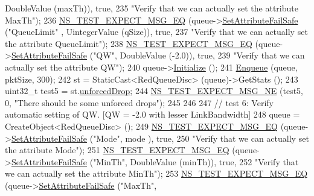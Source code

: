 \begin{DoxyCode}
      DoubleValue (maxTh)), \textcolor{keyword}{true},
235                          \textcolor{stringliteral}{"Verify that we can actually set the attribute MaxTh"});
236   \hyperlink{group__testing_ga7304ba46a28d8cf08dfdfd6499cf7068}{NS\_TEST\_EXPECT\_MSG\_EQ} (queue->\hyperlink{classns3_1_1ObjectBase_aa7d333004e970f925a4ed5df275541b5}{SetAttributeFailSafe} (\textcolor{stringliteral}{"QueueLimit"}
      , UintegerValue (qSize)), \textcolor{keyword}{true},
237                          \textcolor{stringliteral}{"Verify that we can actually set the attribute QueueLimit"});
238   \hyperlink{group__testing_ga7304ba46a28d8cf08dfdfd6499cf7068}{NS\_TEST\_EXPECT\_MSG\_EQ} (queue->\hyperlink{classns3_1_1ObjectBase_aa7d333004e970f925a4ed5df275541b5}{SetAttributeFailSafe} (\textcolor{stringliteral}{"QW"}, 
      DoubleValue (-2.0)), \textcolor{keyword}{true},
239                          \textcolor{stringliteral}{"Verify that we can actually set the attribute QW"});
240   queue->\hyperlink{classns3_1_1Object_af4411cb29971772fcd09203474a95078}{Initialize} ();
241   \hyperlink{classAredQueueDiscTestCase_a5528c44233e1056913e76d5be988f049}{Enqueue} (queue, pktSize, 300);
242   st = StaticCast<RedQueueDisc> (queue)->GetStats ();
243   uint32\_t test5 = st.\hyperlink{structns3_1_1RedQueueDisc_1_1Stats_a242027f6eb7d30e2cd636c52080e2c73}{unforcedDrop};
244   \hyperlink{group__testing_ga6d4b162d26b8a930115b97dd5f3d9ed9}{NS\_TEST\_EXPECT\_MSG\_NE} (test5, 0, \textcolor{stringliteral}{"There should be some unforced drops"});
245 
246 
247   \textcolor{comment}{// test 6: Verify automatic setting of QW. [QW = -2.0 with lesser LinkBandwidth]}
248   queue = CreateObject<RedQueueDisc> ();
249   \hyperlink{group__testing_ga7304ba46a28d8cf08dfdfd6499cf7068}{NS\_TEST\_EXPECT\_MSG\_EQ} (queue->\hyperlink{classns3_1_1ObjectBase_aa7d333004e970f925a4ed5df275541b5}{SetAttributeFailSafe} (\textcolor{stringliteral}{"Mode"}, mode
      ), \textcolor{keyword}{true},
250                          \textcolor{stringliteral}{"Verify that we can actually set the attribute Mode"});
251   \hyperlink{group__testing_ga7304ba46a28d8cf08dfdfd6499cf7068}{NS\_TEST\_EXPECT\_MSG\_EQ} (queue->\hyperlink{classns3_1_1ObjectBase_aa7d333004e970f925a4ed5df275541b5}{SetAttributeFailSafe} (\textcolor{stringliteral}{"MinTh"}, 
      DoubleValue (minTh)), \textcolor{keyword}{true},
252                          \textcolor{stringliteral}{"Verify that we can actually set the attribute MinTh"});
253   \hyperlink{group__testing_ga7304ba46a28d8cf08dfdfd6499cf7068}{NS\_TEST\_EXPECT\_MSG\_EQ} (queue->\hyperlink{classns3_1_1ObjectBase_aa7d333004e970f925a4ed5df275541b5}{SetAttributeFailSafe} (\textcolor{stringliteral}{"MaxTh"}, 

\end{DoxyCode}
